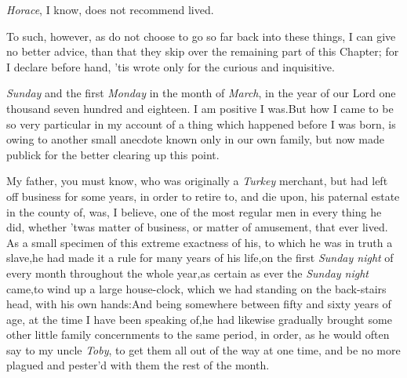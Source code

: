 \documentclass{article}
\begin{document}
\textit{Horace}, I know, does not recommend 
lived.

To such, however, as do not choose to 
go so far back into these things, I can\break
give no better advice, than that they\break
skip over the remaining part of this\break 
Chapter; for I declare before hand, ’tis
wrote only for the curious and inquisitive.

\noindent
{}\break
{}
\textit{Sunday} and the first
\textit{Monday} in the month of \textit{March}, in the year of our Lord one thousand
seven hundred and eighteen.\break
I am positive I was.\tsk  But how I came to be so very
particular in my account of a thing which happened before I was born, is owing to
another small anecdote known only in our own family, but now made publick for the
better clearing up this point.

My father, you must know, who was originally a \textit{Turkey}
merchant, but had left off business for some years, in order to
retire to, and die upon, his paternal estate in the county of\tsh, 
was, I believe, one of the most regular men in
every thing he did, whether ’twas matter of business, or
matter of amusement, that ever lived. As a small specimen of this
extreme exactness of his, to which he was in truth a slave,\tsk he had
made it a rule for many years of his life,\tsk  on the first
\textit{Sunday night} of every month throughout the whole
year,\tsk  as certain as ever the \textit{Sunday night}
came,\tsk  to wind up a large house-clock, which we had standing
on the back-stairs head, with his own hands:\tsk  And being
somewhere between fifty and sixty years of age, at the time I
have been speaking of,\tsk  he had likewise gradually
brought some other little family concernments to the same period,
in order, as he would often say to my uncle \textit{Toby}, to get
them all out of the way at one time, and be no more plagued
and pester’d with them the rest of the month.
\end{document}
